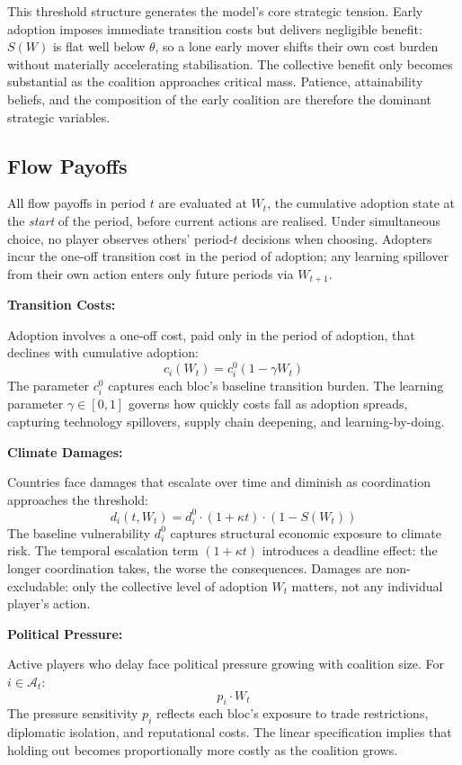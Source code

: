 \documentclass[10pt,a4paper]{article}
\newcommand{\bpar}[1]{\medskip\noindent\textbf{#1}\par}
\begin{document}
This threshold structure generates the model's core strategic tension. Early adoption imposes immediate transition costs but delivers negligible benefit: $S(W)$ is flat well below $\theta$, so a lone early mover shifts their own cost burden without materially accelerating stabilisation. The collective benefit only becomes substantial as the coalition approaches critical mass. Patience, attainability beliefs, and the composition of the early coalition are therefore the dominant strategic variables.

\needspace{12em}
\subsection*{Flow Payoffs}

All flow payoffs in period $t$ are evaluated at $W_t$, the cumulative adoption state at the
\textit{start} of the period, before current actions are realised. Under simultaneous choice,
no player observes others' period-$t$ decisions when choosing. Adopters incur the one-off
transition cost in the period of adoption; any learning spillover from their own action enters
only future periods via $W_{t+1}$.

\bpar{Transition Costs:}
Adoption involves a one-off cost, paid only in the period of adoption, that declines with
cumulative adoption:
\[
c_i(W_t) = c_i^0 \left(1 - \gamma W_t\right)
\]
The parameter $c_i^0$ captures each bloc's baseline transition burden. The learning parameter
$\gamma \in [0,1]$ governs how quickly costs fall as adoption spreads, capturing technology
spillovers, supply chain deepening, and learning-by-doing.

\bpar{Climate Damages:}
Countries face damages that escalate over time and diminish as coordination approaches the
threshold:
\[
d_i(t, W_t) = d_i^0 \cdot (1 + \kappa t) \cdot (1 - S(W_t))
\]
The baseline vulnerability $d_i^0$ captures structural economic exposure to climate risk. The
temporal escalation term $(1 + \kappa t)$ introduces a deadline effect: the longer coordination
takes, the worse the consequences. Damages are non-excludable: only the collective level of
adoption $W_t$ matters, not any individual player's action.

\bpar{Political Pressure:}
Active players who delay face political pressure growing with coalition size. For $i \in
\mathcal{A}_t$:
\[
p_i \cdot W_t
\]
The pressure sensitivity $p_i$ reflects each bloc's exposure to trade restrictions, diplomatic
isolation, and reputational costs. The linear specification implies that holding out becomes
proportionally more costly as the coalition grows.
\end{document}
